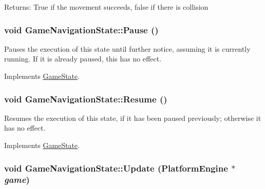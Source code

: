 \begin{Desc}
\item[Returns:]True if the movement succeeds, false if there is collision \end{Desc}
\hypertarget{class_game_navigation_state_ac626b511de8af9f32b7a1492a10f861}{
\subsubsection[{Pause}]{\setlength{\rightskip}{0pt plus 5cm}void GameNavigationState::Pause ()}}
\label{class_game_navigation_state_ac626b511de8af9f32b7a1492a10f861}


Pauses the execution of this state until further notice, assuming it is currently running. If it is already paused, this has no effect. 

Implements \hyperlink{class_game_state_1f4d2b5a2e4dcb7645e3e7a5735926a6}{GameState}.\hypertarget{class_game_navigation_state_4d6aee55eddb1978f493206d985fb950}{
\subsubsection[{Resume}]{\setlength{\rightskip}{0pt plus 5cm}void GameNavigationState::Resume ()}}
\label{class_game_navigation_state_4d6aee55eddb1978f493206d985fb950}


Resumes the execution of this state, if it has been paused previously; otherwise it has no effect. 

Implements \hyperlink{class_game_state_cf9bcd5b47ebb3f572389f64c5ca5ed4}{GameState}.\hypertarget{class_game_navigation_state_90f5e6d6287a875d8f2737180f46a004}{
\subsubsection[{Update}]{\setlength{\rightskip}{0pt plus 5cm}void GameNavigationState::Update ({\bf PlatformEngine} $\ast$ {\em game})}}
\label{class_game_navigation_state_90f5e6d6287a875d8f2737180f46a004}


